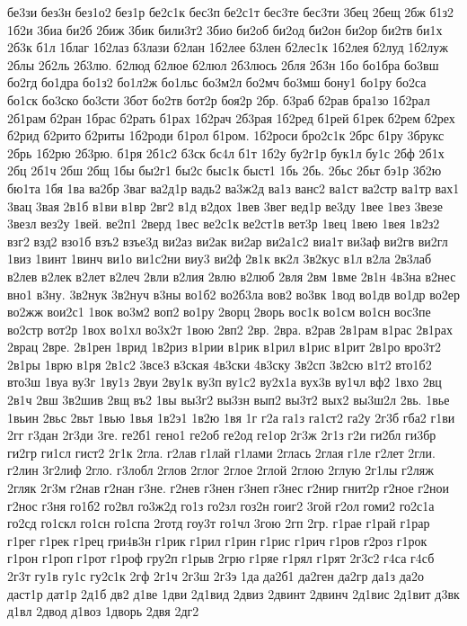бе3зи
без3н
без1о2
без1р
бе2с1к
бес3п
бе2с1т
бес3те
бес3ти
3бец
2бещ
2бж
б1з2
1б2и
3биа
би2б
2биж
3бик
били3т2
3био
би2об
би2од
би2он
би2ор
би2тв
би1х
2б3к
б1л
1благ
1б2лаз
б3лази
б2лан
1б2лее
б3лен
б2лес1к
1б2лея
б2луд
1б2луж
2блы
2б2ль
2б3лю.
б2люд
б2люе
б2люл
2б3люсь
2бля
2б3н
1бо
бо1бра
бо3вш
бо2гд
бо1дра
бо1з2
бо1л2ж
бо1льс
бо3м2л
бо2мч
бо3мш
бону1
бо1ру
бо2са
бо1ск
бо3ско
бо3сти
3бот
бо2тв
бот2р
боя2р
2бр.
б3раб
б2рав
бра1зо
1б2рал
2б1рам
б2ран
1брас
б2рать
б1рах
1б2рач
2б3рая
1б2ред
б1рей
б1рек
б2рем
б2рех
б2рид
б2рито
б2риты
1б2роди
б1рол
б1ром.
1б2роси
бро2с1к
2брс
б1ру
3брукс
2брь
1б2рю
2б3рю.
б1ря
2б1с2
б3ск
бс4л
б1т
1б2у
бу2г1р
бук1л
бу1с
2бф
2б1х
2бц
2б1ч
2бш
2бщ
1бы
бы2г1
бы2с
быс1к
быст1
1бь
2бь.
2бьс
2бьт
бэ1р
3б2ю
бю1та
1бя
1ва
ва2бр
3ваг
ва2д1р
вадь2
ва3ж2д
ва1з
ванс2
ва1ст
ва2стр
ва1тр
вах1
3вац
3вая
2в1б
в1ви
в1вр
2вг2
в1д
в2дох
1вев
3вег
вед1р
ве3ду
1вее
1вез
3везе
3везл
вез2у
1вей.
ве2п1
2верд
1вес
ве2с1к
ве2ст1в
вет3р
1вец
1вею
1вея
1в2з2
взг2
взд2
взо1б
взъ2
взъе3д
ви2аз
ви2ак
ви2ар
ви2а1с2
виа1т
ви3аф
ви2гв
ви2гл
1виз
1винт
1винч
ви1о
ви1с2ни
виу3
ви2ф
2в1к
вк2л
3в2кус
в1л
в2ла
2в3лаб
в2лев
в2лек
в2лет
в2леч
2вли
в2лия
2влю
в2люб
2вля
2вм
1вме
2в1н
4в3на
в2нес
вно1
в3ну.
3в2нук
3в2нуч
в3ны
во1б2
во2б3ла
вов2
во3вк
1вод
во1дв
во1др
во2ер
во2жж
вои2с1
1вок
во3м2
воп2
во1ру
2ворц
2ворь
вос1к
во1см
во1сн
вос3пе
во2стр
вот2р
1вох
во1хл
во3х2т
1вою
2вп2
2вр.
2вра.
в2рав
2в1рам
в1рас
2в1рах
2врац
2вре.
2в1рен
1врид
1в2риз
в1рии
в1рик
в1рил
в1рис
в1рит
2в1ро
вро3т2
2в1ры
1врю
в1ря
2в1с2
3все3
в3ская
4в3ски
4в3ску
3в2сп
3в2сю
в1т2
вто1б2
вто3ш
1вуа
ву3г
1ву1з
2вуи
2ву1к
ву3п
ву1с2
ву2х1а
вух3в
ву1чл
вф2
1вхо
2вц
2в1ч
2вш
3в2шив
2вщ
въ2
1вы
вы3г2
вы3зн
вып2
вы3т2
вых2
вы3ш2л
2вь.
1вье
1вьин
2вьс
2вьт
1вью
1вья
1в2э1
1в2ю
1вя
1г
г2а
га1з
га1ст2
га2у
2г3б
гба2
г1ви
2гг
г3дан
2г3ди
3ге.
ге2б1
гено1
ге2об
ге2од
ге1ор
2г3ж
2г1з
г2и
ги2бл
ги3бр
ги2гр
ги1сл
гист2
2г1к
2гла.
г2лав
г1лай
г1лами
2глась
2глая
г1ле
г2лет
2гли.
г2лин
3г2лиф
2гло.
г3лобл
2глов
2глог
2глое
2глой
2глою
2глую
2г1лы
г2ляж
2гляк
2г3м
г2нав
г2нан
г3не.
г2нев
г3нен
г3неп
г3нес
г2нир
гнит2р
г2ное
г2нои
г2нос
г3ня
го1б2
го2вл
го3ж2д
го1з
го2зл
гоз2н
гоиг2
3гой
г2ол
гоми2
го2с1а
го2сд
го1скл
го1сн
го1спа
2готд
гоу3т
го1чл
3гою
2гп
2гр.
г1рае
г1рай
г1рар
г1рег
г1рек
г1рец
гри4в3н
г1рик
г1рил
г1рин
г1рис
г1рич
г1ров
г2роз
г1рок
г1рон
г1роп
г1рот
г1роф
гру2п
г1рыв
2грю
г1ряе
г1рял
г1рят
2г3с2
г4са
г4сб
2г3т
гу1в
гу1с
гу2с1к
2гф
2г1ч
2г3ш
2г3э
1да
да2б1
да2ген
да2гр
да1з
да2о
даст1р
дат1р
2д1б
дв2
д1ве
1дви
2д1вид
2двиз
2двинт
2двинч
2д1вис
2д1вит
д3вк
д1вл
2двод
д1воз
1дворь
2двя
2дг2

